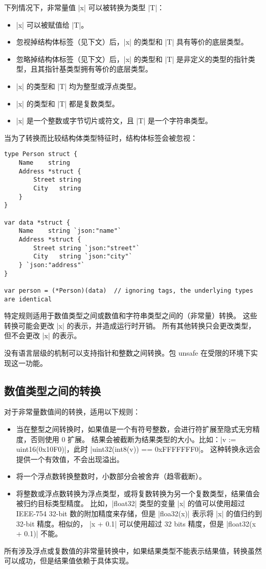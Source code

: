下列情况下，非常量值 \code|x| 可以被转换为类型 \code|T|：
\begin{itemize}
\item \code|x| 可以被赋值给 \code|T|。
\item 忽视掉结构体标签（见下文）后，\code|x| 的类型和 \code|T| 具有等价的底层类型。
\item 忽略掉结构体标签（见下文）后，\code|x| 的类型和 \code|T| 是非定义的类型的指针类型，且其指针基类型拥有等价的底层类型。
\item \code|x| 的类型和 \code|T| 均为整型或浮点类型。
\item \code|x| 的类型和 \code|T| 都是复数类型。
\item  \code|x| 是一个整数或字节切片或符文，且 \code|T| 是一个字符串类型。
\end{itemize}
当为了转换而比较结构体类型特征时，结构体标签会被忽视：
\begin{lstlisting}[style=golang]
type Person struct {
	Name    string
	Address *struct {
		Street string
		City   string
	}
}

var data *struct {
	Name    string `json:"name"`
	Address *struct {
		Street string `json:"street"`
		City   string `json:"city"`
	} `json:"address"`
}

var person = (*Person)(data)  // ignoring tags, the underlying types are identical
\end{lstlisting}
特定规则适用于数值类型之间或数值和字符串类型之间的（非常量）转换。
这些转换可能会更改 \code|x| 的表示，并造成运行时开销。
所有其他转换只会更改类型，但不会更改 \code|x| 的表示。

没有语言层级的机制可以支持指针和整数之间转换。包 unsafe 在受限的环境下实现这一功能。

\subsection{数值类型之间的转换}
对于非常量数值间的转换，适用以下规则：
\begin{itemize}
\item 当在整型之间转换时，如果值是一个有符号整数，会进行符扩展至隐式无穷精度，否则使用 0 扩展。
结果会被截断为结果类型的大小。比如：\code|v := uint16(0x10F0)|，此时 \code|uint32(int8(v)) == 0xFFFFFFF0|。
这种转换永远会提供一个有效值，不会出现溢出。 
\item  将一个浮点数转换整数时，小数部分会被舍弃（趋零截断）。
\item  将整数或浮点数转换为浮点类型，或将复数转换为另一个复数类型，结果值会被归约目标类型精度。
比如，\code|float32| 类型的变量 \code|x| 的值可以使用超过 IEEE-754 32-bit 数的附加精度来存储，但是 \code|floa32(x)| 表示将 \code|x| 的值归约到 32-bit 精度。相似的， \code|x + 0.1| 可以使用超过 32 bits 精度，但是 \code|float32(x + 0.1)| 不能。
\end{itemize}
所有涉及浮点或复数值的非常量转换中，如果结果类型不能表示结果值，转换虽然可以成功，但是结果值依赖于具体实现。

